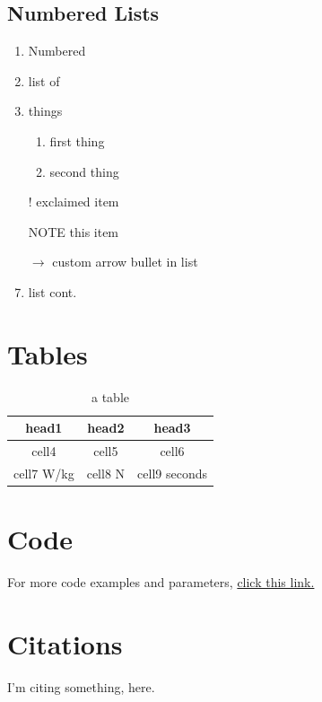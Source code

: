 \documentclass{article}
\begin{document}
\subsection{Numbered Lists}
\begin{enumerate}
	\item Numbered
	\item list of 
	\item things
	\begin{enumerate}
		\item first thing
		\item second thing
	\end{enumerate}
	\item[!] exclaimed item
	\item[NOTE] this item
	\item[$\rightarrow$] custom arrow bullet in list
	\item list cont.
\end{enumerate}


\pagebreak
\section{Tables}
\begin{table}[h]
\caption{a table}
\vspace{-3mm}
\begin{center}
\begin{tabular}{ ||c|c|c|| } 
 \hline
 \textbf{head1} & \textbf{head2} & \textbf{head3} \\ 
 \hline
 \hline
 cell4 & cell5 & cell6 \\ 
 \hline
 cell7 W/kg  & 
 cell8 N  & 
 cell9 seconds \\ 
 \hline
\end{tabular}
\end{center}
\end{table}


\section{Code}



\vspace{5mm}
For more code examples and parameters, \href{https://www.overleaf.com/learn/latex/Code_listing}{click this link.}


\vspace{0.5in}
\section{Citations}

I'm citing something, here. \cite{einstein}

\pagebreak
\printbibliography
\end{document}
